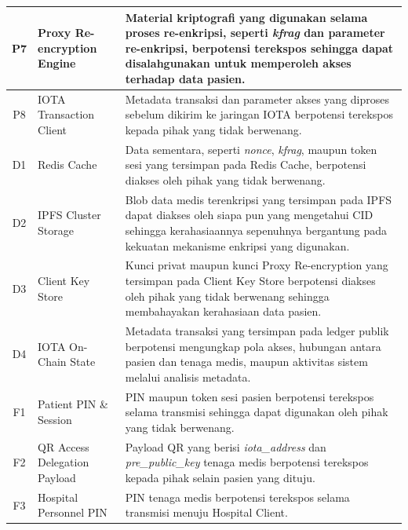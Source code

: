 \begin{xltabular}{\textwidth}{|c|>{\raggedright\arraybackslash}p{3.2cm}|X|}
    P7 &
    Proxy Re-encryption Engine &
    Material kriptografi yang digunakan selama proses re-enkripsi, seperti \textit{kfrag} dan parameter re-enkripsi, berpotensi terekspos sehingga dapat disalahgunakan untuk memperoleh akses terhadap data pasien. \\
    \hline

    P8 &
    IOTA Transaction Client &
    Metadata transaksi dan parameter akses yang diproses sebelum dikirim ke jaringan IOTA berpotensi terekspos kepada pihak yang tidak berwenang. \\
    \hline

    D1 &
    Redis Cache &
    Data sementara, seperti \textit{nonce}, \textit{kfrag}, maupun token sesi yang tersimpan pada Redis Cache, berpotensi diakses oleh pihak yang tidak berwenang. \\
    \hline

    D2 &
    IPFS Cluster Storage &
    Blob data medis terenkripsi yang tersimpan pada IPFS dapat diakses oleh siapa pun yang mengetahui CID sehingga kerahasiaannya sepenuhnya bergantung pada kekuatan mekanisme enkripsi yang digunakan. \\
    \hline

    D3 &
    Client Key Store &
    Kunci privat maupun kunci Proxy Re-encryption yang tersimpan pada Client Key Store berpotensi diakses oleh pihak yang tidak berwenang sehingga membahayakan kerahasiaan data pasien. \\
    \hline

    D4 &
    IOTA On-Chain State &
    Metadata transaksi yang tersimpan pada ledger publik berpotensi mengungkap pola akses, hubungan antara pasien dan tenaga medis, maupun aktivitas sistem melalui analisis metadata. \\
    \hline

    F1 &
    Patient PIN \& Session &
    PIN maupun token sesi pasien berpotensi terekspos selama transmisi sehingga dapat digunakan oleh pihak yang tidak berwenang. \\
    \hline

    F2 &
    QR Access Delegation Payload &
    Payload QR yang berisi \textit{iota\_address} dan \textit{pre\_public\_key} tenaga medis berpotensi terekspos kepada pihak selain pasien yang dituju. \\
    \hline

    F3 &
    Hospital Personnel PIN &
    PIN tenaga medis berpotensi terekspos selama transmisi menuju Hospital Client. \\
    \hline


\end{xltabular}
